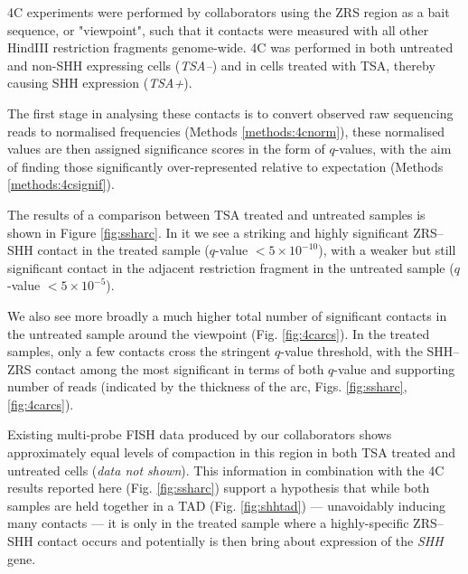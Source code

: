 \documentclass[a4paper,11pt,oneside]{book}
\begin{document}
4C experiments were performed by collaborators using the ZRS region as a bait sequence, or "viewpoint", such that it contacts were measured with all other HindIII restriction fragments genome-wide. 4C was performed in both untreated and non-SHH expressing cells (\emph{TSA--}) and in cells treated with TSA, thereby causing SHH expression (\emph{TSA+}). 

The first stage in analysing these contacts is to convert observed raw sequencing reads to normalised frequencies (Methods \ref{methods:4cnorm}), these normalised values are then assigned significance scores in the form of $q$-values, with the aim of finding those significantly over-represented relative to expectation (Methods \ref{methods:4csignif}).

The results of a comparison between TSA treated and untreated samples is shown in Figure \ref{fig:ssharc}. In it we see a striking and highly significant ZRS--SHH contact in the treated sample ($q$-value $ < 5 \times 10^{-10}$), with a weaker but still significant contact in the adjacent restriction fragment in the untreated sample ($q$-value $ < 5 \times 10^{-5}$). 

We also see more broadly a much higher total number of significant contacts in the untreated sample around the viewpoint (Fig. \ref{fig:4carcs}). In the treated samples, only a few contacts cross the stringent $q$-value threshold, with the SHH--ZRS contact among the most significant in terms of both $q$-value and supporting number of reads (indicated by the thickness of the arc, Figs. \ref{fig:ssharc}, \ref{fig:4carcs}).

Existing multi-probe FISH data produced by our collaborators shows approximately equal levels of compaction in this region in both TSA treated and untreated cells (\emph{data not shown}). This information in combination with the 4C results reported here (Fig. \ref{fig:ssharc}) support a hypothesis that while both samples are held together in a TAD (Fig. \ref{fig:shhtad}) --- unavoidably inducing many contacts --- it is only in the treated sample where a highly-specific ZRS--SHH contact occurs and potentially is then bring about expression of the \emph{SHH} gene.

\end{document}
